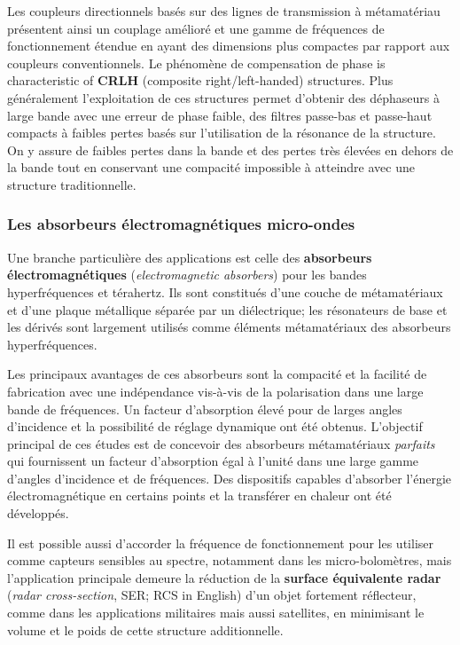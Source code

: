 Les coupleurs directionnels basés sur des lignes de transmission à métamatériau
présentent ainsi un couplage amélioré et une gamme de fréquences de
fonctionnement étendue en ayant des dimensions plus compactes par rapport aux
coupleurs conventionnels. Le phénomène de compensation de phase is
characteristic of \textbf{CRLH} (composite right/left-handed) structures. Plus
généralement l'exploitation de ces structures permet d'obtenir des déphaseurs à
large bande avec une erreur de phase faible, des filtres passe-bas et passe-haut
compacts à faibles pertes basés sur l'utilisation de la résonance de la
structure. On y assure de faibles pertes dans la bande et des pertes très
élevées en dehors de la bande tout en conservant une compacité impossible à
atteindre avec une structure traditionnelle.

\subsubsection{Les absorbeurs électromagnétiques micro-ondes}

Une branche particulière des applications est celle des \textbf{absorbeurs
électromagnétiques} (\textit{electromagnetic absorbers}) pour les bandes
hyperfréquences et térahertz. Ils sont constitués d'une couche de métamatériaux et
d'une plaque métallique séparée par un diélectrique; les résonateurs de base et
les dérivés sont largement utilisés comme éléments métamatériaux des absorbeurs
hyperfréquences.

\begin{conclusion}
  Les principaux avantages de ces absorbeurs sont la compacité et la facilité de
  fabrication avec une indépendance vis-à-vis de la polarisation dans une large
  bande de fréquences. Un facteur d'absorption élevé pour de larges angles
  d'incidence et la possibilité de réglage dynamique ont été obtenus.
  L'objectif principal de ces études est de concevoir des absorbeurs
  métamatériaux \emph{parfaits} qui fournissent un facteur d'absorption égal à
  l'unité dans une large gamme d'angles d'incidence et de fréquences. Des
  dispositifs capables d'absorber l'énergie électromagnétique en certains points
  et la transférer en chaleur ont été développés.
\end{conclusion}

Il est possible aussi d'accorder la fréquence de fonctionnement pour les
utiliser comme capteurs sensibles au spectre, notamment dans les
micro-bolomètres, mais l'application principale demeure la réduction de la
\textbf{surface équivalente radar} (\textit{radar cross-section}, SER; RCS in
English) d'un objet fortement réflecteur, comme dans les applications
militaires mais aussi satellites, en minimisant le volume et le poids de cette
structure additionnelle.

